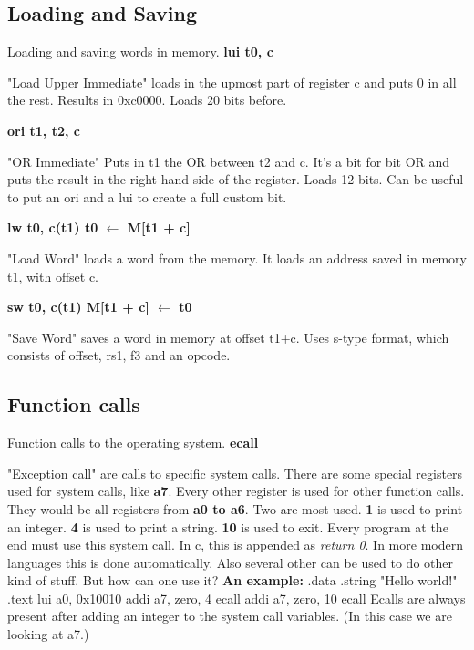 \documentclass{article}
\begin{document}
    \subsection{Loading and Saving}
    \par Loading and saving words in memory.\medbreak
    \textbf{lui t0, c}
    \par "Load Upper Immediate" loads in the upmost part of register c and
    puts 0 in all the rest. Results in 0xc0000. Loads 20 bits before.\medbreak

    \textbf{ori t1, t2, c}
    \par "OR Immediate" Puts in t1 the OR between t2 and c. It's a
    bit for bit OR and puts the result in the right hand side of the register.
    Loads 12 bits. Can be useful to put an ori and a lui to create a full custom
    bit. \medbreak

    \textbf{lw t0, c(t1) \qquad t0 $\leftarrow$ M[t1 + c]}
    \par "Load Word" loads a word from the memory. It loads an address saved in 
    memory t1, with offset c. \medbreak 

    \textbf{sw t0, c(t1) \qquad M[t1 + c] $\leftarrow$ t0 }
    \par "Save Word" saves a word in memory at offset t1+c. Uses s-type format,
    which consists of offset, rs1, f3 and an opcode. \medbreak


    \subsection{Function calls}
    Function calls to the operating system.\smallbreak 
    \textbf{ecall}
    \par "Exception call" are calls to specific system calls. There are some
    special registers used for system calls, like \textbf{a7}. Every other register
    is used for other function calls. They would be all registers from \textbf{a0 to a6}.
    Two are most used. \smallbreak
    \textbf{1} is used to print an integer.\smallbreak
    \textbf{4} is used to print a string. \smallbreak
    \textbf{10} is used to exit. Every program at the end must use this system call.
    In c, this is appended as \textit{return 0}. In more modern languages this is done
    automatically.  \smallbreak
    Also several other can be used to do other kind of stuff. But how can one use it?
    \smallbreak
    \textbf{An example: }\smallbreak
    .data\smallbreak
    \qquad .string "Hello world!"\smallbreak
    .text\smallbreak
    \qquad lui a0, 0x10010\smallbreak
    \qquad addi a7, zero, 4\smallbreak
    \qquad ecall\smallbreak
    \qquad addi a7, zero, 10\smallbreak
    \qquad ecall \smallbreak
    Ecalls are always present after adding an integer to the system call variables.
    (In this case we are looking at a7.)  
\end{document}
